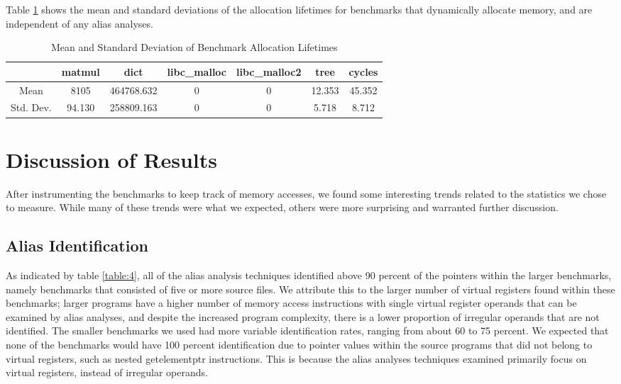 Table \ref{table:7} shows the mean and standard deviations of the allocation lifetimes for benchmarks that dynamically allocate memory, and are independent of any alias analyses.

\begin{table} [h!]
\centering
   \begin{tabular} {|c|c c c c c c|}
      \hline
      & matmul & dict & libc\_malloc & libc\_malloc2 & tree & cycles \\
      \hline
      Mean & 8105 & 464768.632 & 0 & 0 & 12.353 & 45.352 \\
      \hline
      Std. Dev. & 94.130 & 258809.163 & 0 & 0 & 5.718 & 8.712 \\
      \hline
   \end{tabular}
   \caption{Mean and Standard Deviation of Benchmark Allocation Lifetimes}
   \label{table:7}
\end{table}

\section{Discussion of Results}
After instrumenting the benchmarks to keep track of memory accesses, we found some interesting trends related to the statistics we chose to measure. While many of these trends were what we expected, others were more surprising and warranted further discussion.

\subsection{Alias Identification}
As indicated by table \ref{table:4}, all of the alias analysis techniques identified above 90 percent of the pointers within the larger benchmarks, namely benchmarks that consisted of five or more source files. We attribute this to the larger number of virtual registers found within these benchmarks; larger programs have a higher number of memory access instructions with single virtual register operands that can be examined by alias analyses, and despite the increased program complexity, there is a lower proportion of irregular operands that are not identified. The smaller benchmarks we used had more variable identification rates, ranging from about 60 to 75 percent. We expected that none of the benchmarks would have 100 percent identification due to pointer values within the source programs that did not belong to virtual registers, such as nested getelementptr instructions. This is because the alias analyses techniques examined primarily focus on virtual registers, instead of irregular operands.

